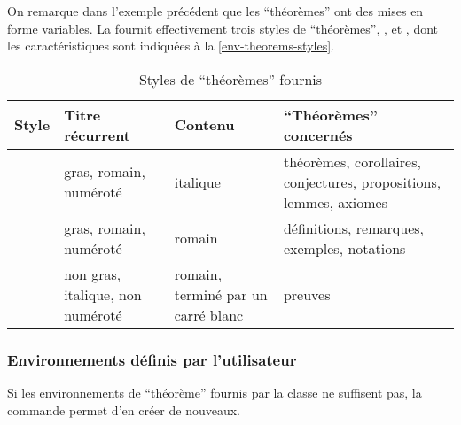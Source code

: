 \documentclass[french,nolocaltoc]{nwejmart}
\newtheorem[style=definition]{fait}
\newtheorem[title=expérience]{experience}
\newtheorem[title-plural=anneaux]{anneau}
\newtheorem[title=idéal,title-plural=idéaux]{ideal}
\begin{document}
On remarque dans l'exemple précédent que les \enquote{théorèmes} ont des mises
en forme variables. La \nwejmauthorcl{} fournit effectivement trois styles de
\enquote{théorèmes}, ,  et
, dont les caractéristiques sont indiquées à la
\vref{env-theorems-styles}.

\begin{table}
  \centering
  \begin{tabulary}{\linewidth}{lLLL}
Style                 & Titre récurrent                  & Contenu                            & \enquote{Théorèmes} concernés               \\\toprule
{}    & gras, romain, numéroté           & italique
                      & théorèmes, corollaires, conjectures, propositions, lemmes, axiomes                                                  \\\midrule
{} & gras, romain, numéroté           & romain                             & définitions, remarques, exemples, notations \\\midrule
{}      & non gras, italique, non numéroté & romain, terminé par un carré blanc & preuves                                     \\\bottomrule
  \end{tabulary}
  \caption{Styles de \enquote{théorèmes} fournis}
  \label{env-theorems-styles}
\end{table}

\subsubsection{Environnements définis par l'utilisateur}
\label{sec:envir-de-type-1}

Si les environnements de \enquote{théorème} fournis par la classe ne suffisent
pas, la commande  permet d'en créer de nouveaux.
\end{document}
